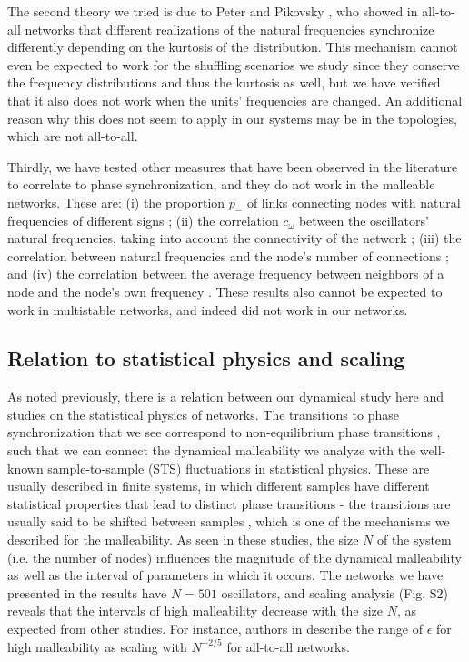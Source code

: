 The second theory we tried is due to Peter and Pikovsky \cite{peter2018transition}, who showed in all-to-all networks that different realizations of the natural frequencies synchronize differently depending on the kurtosis of the distribution. This mechanism cannot even be expected to work for the shuffling scenarios we study since they conserve the frequency distributions and thus the kurtosis as well, but we have verified that it also does not work when the units' frequencies are changed. An additional reason why this does not seem to apply in our systems may be in the topologies, which are not all-to-all.

Thirdly, we have tested other measures that have been observed in the literature to correlate to phase synchronization, and they do not work in the malleable networks. These are: (i) the proportion $p_-$ of links connecting nodes with natural frequencies of different signs \cite{brede2008synchrony};  (ii) the correlation $c_\omega$ between the oscillators' natural frequencies, taking into account the connectivity of the network \cite{brede2008synchrony, carareto2009optimized}; (iii) the correlation between natural frequencies and the node's number of connections \cite{skardal2014optimal}; and (iv) the correlation between the average frequency between neighbors of a node and the node's own frequency \cite{buzna2009synchronization, skardal2014optimal}. These results also cannot be expected to work in multistable networks, and indeed did not work in our networks. 


\subsection{Relation to statistical physics and scaling}
As noted previously, there is a relation between our dynamical study here and studies on the statistical physics of networks. The transitions to phase synchronization that we see correspond to non-equilibrium phase transitions \cite{kuramoto1984chemical, peter2018transition}, such that we can connect the dynamical malleability we analyze with the well-known sample-to-sample (STS) fluctuations in statistical physics. These are usually described in finite systems, in which different samples have different statistical properties that lead to distinct phase transitions - the transitions are usually said to be shifted between samples \cite{sornette2006critical, hong2007finitesizescalingpre, hong2007entrainment}, which is one of the mechanisms we described for the malleability.
As seen in these studies, the size $N$ of the system (i.e. the number of nodes) influences the magnitude of the dynamical malleability as well as the interval of parameters in which it occurs. The networks we have presented in the results have $N = 501$ oscillators, and scaling analysis (Fig. S2) reveals that the intervals of high malleability decrease with the size $N$, as expected from other studies. For instance, authors in \cite{hong2007entrainment} describe the range of $\epsilon$ for high malleability as scaling with $N^{-2/5}$ for all-to-all networks. 

